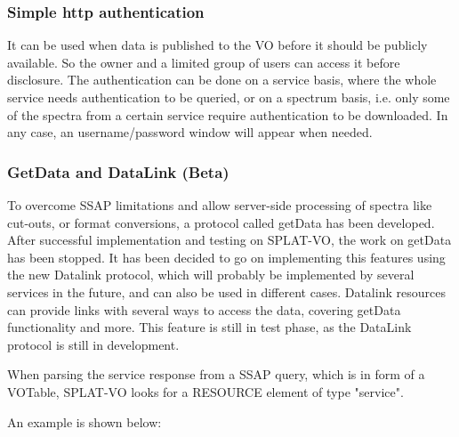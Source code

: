 \documentclass[final,authoryear,5p,times,twocolumn]{elsarticle}
\begin{document}
\subsubsection{Simple http authentication}

It can be used when data is published to the VO before it should be
publicly available. So the owner and a limited group of users can
access it before disclosure. The authentication can be done on a
service basis, where the whole service needs authentication to be
queried, or on a spectrum basis, i.e. only some of the spectra from a
certain service require authentication to be downloaded. In any case,
an username/password window will appear when needed.

\subsubsection{GetData and DataLink (Beta)}

To overcome SSAP limitations and allow server-side processing of
spectra like cut-outs, or format conversions, a protocol called
getData has been developed. After successful implementation and
testing on SPLAT-VO, the work on getData has been stopped. It has been
decided to go on implementing this features using the new Datalink
protocol, which will probably be implemented by several services in
the future, and can also be used in different cases.  Datalink
resources can provide links with several ways to access the data,
covering getData functionality and more. This feature is still in test
phase, as the DataLink protocol is still in development.

When parsing the service response from a SSAP query, which is in form
of a VOTable, SPLAT-VO looks for a RESOURCE element of type "service".

An example is shown below:
\end{document}
